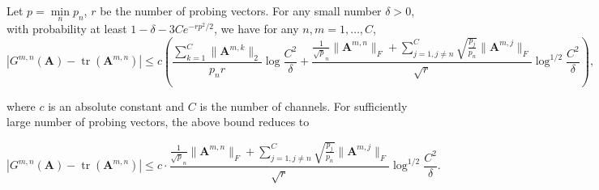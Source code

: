\documentclass[10pt]{article}
\newcommand{\B}{\mathbf}
\newenvironment{manualtheorem}[1]{%
  \renewcommand\themanualtheoreminner{#1}%
  \manualtheoreminner
}{\endmanualtheoreminner}
\begin{document}
\begin{manualtheorem}{1}[] Let $p=\min\limits_n p_n$, $r$ be the number of probing vectors. For any small number $\delta>0$, with probability at least $1-\delta- 3Ce^{-rp^2/2}$, we have for any $n,m=1,\ldots,C$,
\[
|G^{m, n}(\B{A})-\operatorname{tr}(\B{A}^{m,n})| \leq c \left(\frac{\sum\limits_{k=1}^C \|\B{A}^{m,k}\|_2}{p_n r}\log\frac{C^2}{\delta} + \frac{\frac{1}{\sqrt p_n}\|\B{A}^{m,n}\|_F +\sum\limits_{j=1,j\neq n}^C\sqrt{\frac{p_j}{p_n}} \|\B{A}^{m,j}\|_F}{\sqrt {r}} \log^{1/2}\frac{C^2}{\delta} \right),
\]

where $c$ is an absolute constant and $C$ is the number of channels.
For sufficiently large number of probing vectors, the above bound reduces to

\[ |G^{m, n}(\B{A})-\operatorname{tr}(\B{A}^{m,n})| \leq c \cdot  \frac{\frac{1}{\sqrt p_n}\|\B{A}^{m,n}\|_F +\sum\limits_{j=1, j\neq n}^C \sqrt{\frac{p_j}{p_n}}\|\B{A}^{m,j}\|_F}{\sqrt {r}} \log^{1/2} \frac{C^2}{\delta} .\]
\end{manualtheorem}
\end{document}
